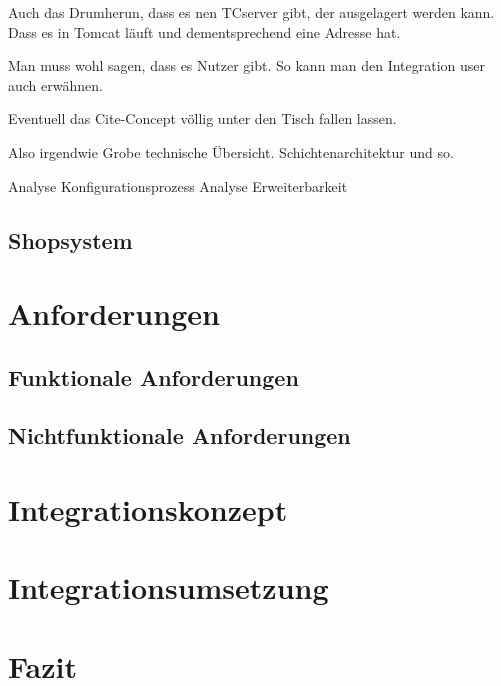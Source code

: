 \documentclass[12pt,a4paper,bibliography=totocnumbered,listof=totoc]{scrartcl}
\begin{document}
Auch das Drumherun, dass es nen TCserver gibt, der ausgelagert werden kann. Dass es in Tomcat läuft und dementsprechend eine Adresse hat.

Man muss wohl sagen, dass es Nutzer gibt. So kann man den Integration user auch erwähnen.

Eventuell das Cite-Concept völlig unter den Tisch fallen lassen.

Also irgendwie Grobe technische Übersicht. Schichtenarchitektur und so.


Analyse Konfigurationsprozess
Analyse Erweiterbarkeit

\subsection{Shopsystem}

\pagebreak

\section{Anforderungen}

\subsection{Funktionale Anforderungen}

\subsection{Nichtfunktionale Anforderungen}

\pagebreak

\section{Integrationskonzept}

\pagebreak

\section{Integrationsumsetzung}

\pagebreak

\section{Fazit}

\pagebreak

\end{document}
